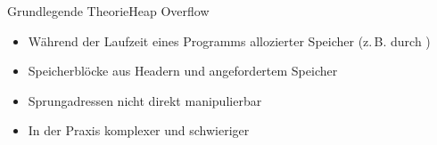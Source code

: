 \begin{frame}{Grundlegende Theorie}{Heap Overflow}
\begin{itemize}
        \item Während der Laufzeit eines Programms allozierter Speicher (z.\,B. durch )
        \item Speicherblöcke aus Headern und angefordertem Speicher
        \item Sprungadressen nicht direkt manipulierbar
        \item In der Praxis komplexer und schwieriger
    \end{itemize}
\end{frame}



